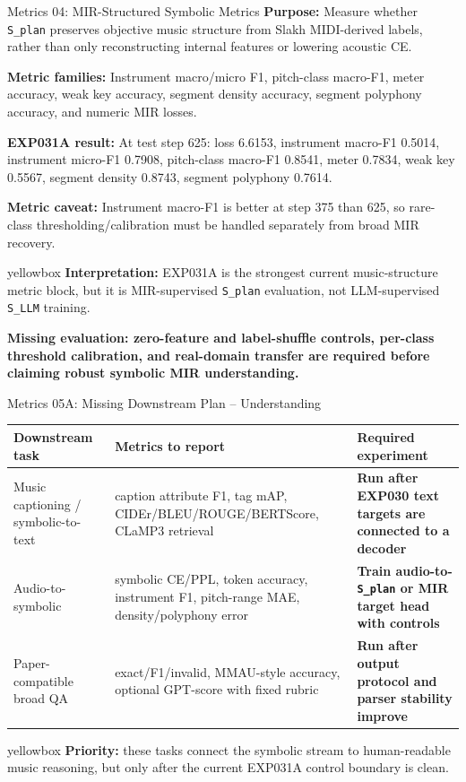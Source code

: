 \documentclass[aspectratio=169,11pt]{beamer}
\newcommand{\missing}[1]{{\color{missingred}\textbf{#1}}}
\newcommand{\code}[1]{\texttt{\footnotesize #1}}
\newcommand{\expfield}[2]{\textbf{#1:} #2\par\vspace{0.10cm}}
\newenvironment{keybox}{%
  \begin{beamercolorbox}[rounded=true,sep=0.14cm,wd=\linewidth]{yellowbox}\footnotesize%
}{%
  \end{beamercolorbox}%
}
\begin{document}
\begin{frame}{Metrics 04: MIR-Structured Symbolic Metrics}
  \footnotesize
  \expfield{Purpose}{Measure whether \code{S\_plan} preserves objective music structure from Slakh MIDI-derived labels, rather than only reconstructing internal features or lowering acoustic CE.}
  \expfield{Metric families}{Instrument macro/micro F1, pitch-class macro-F1, meter accuracy, weak key accuracy, segment density accuracy, segment polyphony accuracy, and numeric MIR losses.}
  \expfield{EXP031A result}{At test step 625: loss 6.6153, instrument macro-F1 0.5014, instrument micro-F1 0.7908, pitch-class macro-F1 0.8541, meter 0.7834, weak key 0.5567, segment density 0.8743, segment polyphony 0.7614.}
  \expfield{Metric caveat}{Instrument macro-F1 is better at step 375 than 625, so rare-class thresholding/calibration must be handled separately from broad MIR recovery.}

  \begin{keybox}\textbf{Interpretation:} EXP031A is the strongest current music-structure metric block, but it is MIR-supervised \code{S\_plan} evaluation, not LLM-supervised \code{S\_LLM} training.\end{keybox}
  \vspace{0.18cm}
  \missing{Missing evaluation: zero-feature and label-shuffle controls, per-class threshold calibration, and real-domain transfer are required before claiming robust symbolic MIR understanding.}
\end{frame}

\begin{frame}{Metrics 05A: Missing Downstream Plan -- Understanding}
  \footnotesize
  \begin{tabularx}{\linewidth}{p{2.5cm}Yp{3.7cm}}
    \toprule
    Downstream task & Metrics to report & Required experiment \\
    \midrule
    Music captioning / symbolic-to-text & caption attribute F1, tag mAP, CIDEr/BLEU/ROUGE/BERTScore, CLaMP3 retrieval & \missing{Run after EXP030 text targets are connected to a decoder} \\
    Audio-to-symbolic & symbolic CE/PPL, token accuracy, instrument F1, pitch-range MAE, density/polyphony error & \missing{Train audio-to-\code{S\_plan} or MIR target head with controls} \\
    Paper-compatible broad QA & exact/F1/invalid, MMAU-style accuracy, optional GPT-score with fixed rubric & \missing{Run after output protocol and parser stability improve} \\
    \bottomrule
  \end{tabularx}

  \vspace{0.2cm}
  \begin{keybox}\textbf{Priority:} these tasks connect the symbolic stream to human-readable music reasoning, but only after the current EXP031A control boundary is clean.\end{keybox}
\end{frame}
\end{document}
